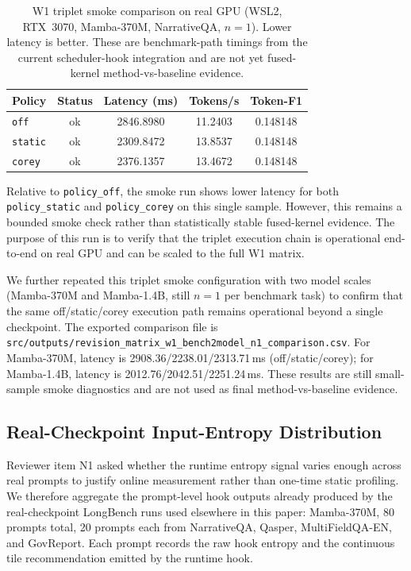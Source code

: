 \begin{table}[!t]
\centering
\caption{W1 triplet smoke comparison on real GPU (WSL2, RTX~3070, Mamba-370M, NarrativeQA, $n{=}1$). Lower latency is better. These are benchmark-path timings from the current scheduler-hook integration and are not yet fused-kernel method-vs-baseline evidence.}
\label{tab:w1_triplet_smoke}
\small
\begin{tabular}{lcccc}
\toprule
Policy & Status & Latency (ms) & Tokens/s & Token-F1 \\
\midrule
\texttt{off}    & ok & 2846.8980 & 11.2403 & 0.148148 \\
\texttt{static} & ok & 2309.8472 & 13.8537 & 0.148148 \\
\texttt{corey}  & ok & 2376.1357 & 13.4672 & 0.148148 \\
\bottomrule
\end{tabular}
\end{table}

Relative to \texttt{policy\_off}, the smoke run shows lower latency for both \texttt{policy\_static} and \texttt{policy\_corey} on this single sample. However, this remains a bounded smoke check rather than statistically stable fused-kernel evidence. The purpose of this run is to verify that the triplet execution chain is operational end-to-end on real GPU and can be scaled to the full W1 matrix.

We further repeated this triplet smoke configuration with two model scales (Mamba-370M and Mamba-1.4B, still $n{=}1$ per benchmark task) to confirm that the same off/static/corey execution path remains operational beyond a single checkpoint. The exported comparison file is \texttt{src/outputs/revision\_matrix\_w1\_bench2model\_n1\_comparison.csv}. For Mamba-370M, latency is 2908.36/2238.01/2313.71\,ms (off/static/corey); for Mamba-1.4B, latency is 2012.76/2042.51/2251.24\,ms. These results are still small-sample smoke diagnostics and are not used as final method-vs-baseline evidence.

\subsection{Real-Checkpoint Input-Entropy Distribution}
\label{sec:entropy_variance_real}

Reviewer item N1 asked whether the runtime entropy signal varies enough across real prompts to justify online measurement rather than one-time static profiling. We therefore aggregate the prompt-level hook outputs already produced by the real-checkpoint LongBench runs used elsewhere in this paper: Mamba-370M, 80 prompts total, 20 prompts each from NarrativeQA, Qasper, MultiFieldQA-EN, and GovReport. Each prompt records the raw hook entropy and the continuous tile recommendation emitted by the runtime hook.

